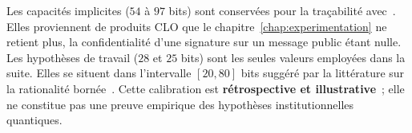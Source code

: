 \begin{sloppypar}
Les capacit\'es implicites ($54$ \`a $97$ bits) sont conserv\'ees pour la tra\c{c}abilit\'e
avec~\cite{MINKA2026PQCRO}. Elles proviennent de produits CLO que le
chapitre~\ref{chap:experimentation} ne retient plus, la confidentialit\'e d'une signature sur un
message public \'etant nulle. Les hypoth\`eses de travail ($28$ et $25$ bits) sont les seules
valeurs employ\'ees dans la suite. Elles se situent dans l'intervalle $[20, 80]$ bits sugg\'er\'e par
la litt\'erature sur la rationalit\'e born\'ee~\cite{Miller56,Simon82,Ericsson95,Cowan2001}. Cette
calibration est \textbf{r\'etrospective et illustrative}~; elle ne constitue pas une preuve
empirique des hypoth\`eses institutionnelles quantiques.
\end{sloppypar}

